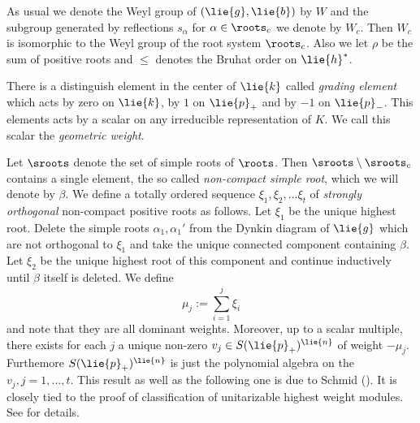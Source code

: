 As usual we denote the Weyl group of $(\lie{g},\lie{b})$ by $W$ and the subgroup generated by reflections $s_\alpha$ for $\alpha\in \roots_c$ we denote by $W_c$. Then $W_c$ is isomorphic to the Weyl group of the root system $\roots_c$. Also we let $\rho$ be the sum of positive roots and $\leq$ denotes the Bruhat order on $\lie{h}^*$.

There is a distinguish element in the center of $\lie{k}$ called \emph{grading element} which acts by zero on $\lie{k}$, by $1$ on $\lie{p}_+$ and by $-1$ on $\lie{p}_-$. This elements acts by a scalar on any irreducible representation of $K$. We call this scalar the \emph{geometric weight}.

Let $\sroots$ denote the set of  simple roots of $\roots$. Then $\sroots\setminus \sroots_c$ contains a single element, the so called \emph{non-compact simple root}, which we will denote by $\beta$. We define a totally ordered sequence $\xi_1,\xi_2,\ldots \xi_t$ of \emph{strongly orthogonal} non-compact positive roots as follows. Let $\xi_1$ be the unique highest root. Delete the simple roots $\alpha_1,\alpha_1'$ from the Dynkin diagram of $\lie{g}$ which are not orthogonal to $\xi_1$ and take the unique connected component containing $\beta$. Let $\xi_2$ be the unique highest root of this component and continue inductively until $\beta$ itself is deleted. We define
\[\mu_j := \sum_{i=1}^j \xi_i\]
and note that they are all dominant weights. Moreover, up to a scalar multiple, there exists for each $j$ a unique non-zero $v_j\in S(\lie{p}_+)^{\lie{n}}$ of weight $-\mu_j.$ Furthemore $S(\lie{p}_+)^{\lie{n}}$ is just the polynomial algebra on the $v_j,j=1,\ldots, t.$ This result as well as the following one is due to Schmid  (\cite{schmid_decomp}). It is closely tied to the proof of classification of unitarizable highest weight modules. See \cite{enright_intrinsic_1990} for details.


